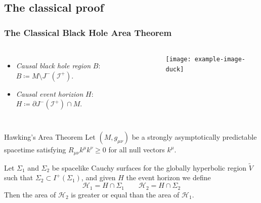 \documentclass[handout]{beamer}
\begin{document}
	\subsection{The classical proof}
	\begin{frame}
		\frametitle{The Classical Black Hole Area Theorem}

		\begin{columns}
			\begin{itemize}
				\item \emph{Causal black hole region} \(B\): \(B \coloneqq M \setminus J^-(\mathscr{I}^+)\).
				\item \emph{Causal event horizion} \(H\): \(H\coloneqq \partial J^-(\mathscr{I}^+) \cap M \).
			\end{itemize}
		
			\texttt{[image: example-image-duck]}
		\end{columns}
		\begin{theoblock}{Hawking's Area Theorem}
			Let \((M, g_{\mu\nu})\) be a strongly asymptotically predictable spacetime satisfying \(R_{\mu\nu}k^{\mu}k^{\nu} \ge 0\) for all null vectors \(k^{\mu}\). 
			
			Let \(\Sigma_1\) and \(\Sigma_2\) be spacelike Cauchy surfaces for the globally hyperbolic region \(\tilde{V}\) such that \(\Sigma_2 \subset I^+(\Sigma_1)\), and given \(H\) the event horizon we define
			\[
			\mathscr{H}_1 = H \cap \Sigma_1 \quad \quad \mathscr{H}_2 = H \cap \Sigma_2
			\]
			Then the area of \(\mathscr{H}_2\) is greater or equal than the area of \(\mathscr{H}_1\).
		\end{theoblock}
	\end{frame}
\end{document}
